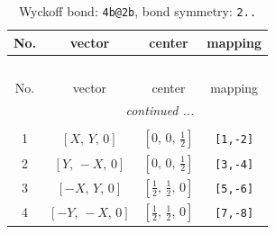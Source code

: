 \documentclass[fleqn,8pt]{jsarticle}
\begin{document}
\renewcommand{\arraystretch}{1.2}
\begin{longtable}{cccc}
\caption{Wyckoff bond: {\tt 4b@2b}, bond symmetry: {\tt 2..}}
 \\
 \hline \hline
No. & vector & center & mapping \\ \hline \endfirsthead

\multicolumn{3}{l}{\tablename\ \thetable{}} \\
 \hline \hline
No. & vector & center & mapping \\ \hline \endhead

 \hline \hline
\multicolumn{3}{r}{\footnotesize\it continued ...} \\ \endfoot

 \hline \hline
\multicolumn{3}{r}{} \\ \endlastfoot

1 & $\left[ X,\, Y,\, 0 \right]$ & $\left[ 0,\, 0,\, \frac{1}{2} \right]$ & {\tt [1,-2]} \\ \hline
2 & $\left[ Y,\, - X,\, 0 \right]$ & $\left[ 0,\, 0,\, \frac{1}{2} \right]$ & {\tt [3,-4]} \\ \hline
3 & $\left[ - X,\, Y,\, 0 \right]$ & $\left[ \frac{1}{2},\, \frac{1}{2},\, 0 \right]$ & {\tt [5,-6]} \\ \hline
4 & $\left[ - Y,\, - X,\, 0 \right]$ & $\left[ \frac{1}{2},\, \frac{1}{2},\, 0 \right]$ & {\tt [7,-8]} \\
\end{longtable}
\renewcommand{\arraystretch}{1.2}
\end{document}
